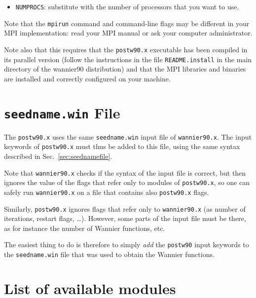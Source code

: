 \begin{itemize} \item 
{\tt NUMPROCS}: substitute with the number of processors that you want
to use.
\end{itemize}

Note that the {\tt mpirun} command and command-line flags may be
different in your MPI implementation: read your MPI manual or ask your
computer administrator.

Note also that this requires that the {\tt postw90.x} executable has been
compiled in its parallel version (follow the instructions in the file
{\tt README.install} in the main directory of the wannier90
distribution) and
that the MPI libraries and binaries are installed and correctly
configured on your machine.

\section[seedname.win File]{{\tt seedname.win} File}
The \texttt{postw90.x} uses the same \texttt{seedname.win} input file
of \texttt{wannier90.x}. The input keywords of \texttt{postw90.x} must
thus be added to this file, using the same syntax described in
Sec.~\ref{sec:seednamefile}. 

Note that \texttt{wannier90.x} checks if the syntax of the input file
is correct, but then ignores the value of the flags that refer only to
modules of \texttt{postw90.x}, so one can safely run
\texttt{wannier90.x} on a file that contains also \texttt{postw90.x}
flags.

Similarly, \texttt{postw90.x} ignores flags that refer only to
\texttt{wannier90.x} (as number of iterations, restart flags,
\ldots). However, some parts of the input file must be there, as for
instance the number of Wannier functions, etc.

The easiest thing to do
is therefore to simply \emph{add} the \texttt{postw90} input keywords to
the \texttt{seedname.win} file that was used
to obtain the Wannier functions.

\section{List of available modules}

